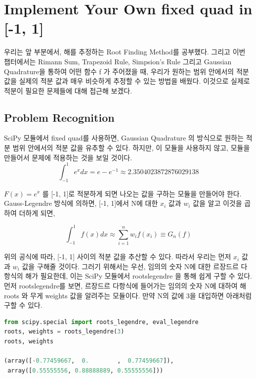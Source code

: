 \documentclass[11pt]{article}
\title{}
\author{MinWook Kang}
\date{\today}
\begin{document}
\maketitle
\pagebreak





\section{Implement Your Own fixed quad in [-1, 1]}

우리는 앞 부분에서, 해를 추정하는 Root Finding Method를 공부했다. 그리고 이번 챕터에서는 Rimann Sum, Trapezoid Rule, Simpsion's Rule 그리고 Gaussian Quadrature을 통하여 어떤 함수 f 가 주어졌을 때, 우리가 원하는 범위 안에서의 적분 값을 실제의 적분 값과 매우 비슷하게 추정할 수 있는 방법을 배웠다. 이것으로 실제로 적분이 필요한 문제들에 대해 접근해 보겠다.
\subsection{Problem Recognition} 
SciPy 모듈에서 fixed quad를 사용하면, Gaussian Quadrature 의 방식으로 원하는 적분 범위 안에서의 적분 값을 유추할 수 있다. 하지만, 이 모듈을 사용하지 않고, 모듈을 만들어서 문제에 적용하는 것을 보일 것이다. 
\begin{equation}
\int_{-1}^{1} e^x dx = e - e^{-1} \approx 2.3504023872876029138
\end{equation}

$F(x) = e^x$ 를 [-1, 1]로 적분하게 되면 나오는 값을 구하는 모듈을 만들어야 한다. Gauss-Legendre 방식에 의하면, [-1, 1]에서 N에 대한 $x_i$ 값과 $w_i$ 값을 알고 이것을 곱하여 더하게 되면, 

\begin{equation}
\int_{-1}^1 f(x) dx \approx \sum_{i = 1}^n w_i f(x_i) \equiv G_n(f)
\end{equation}

위의 공식에 따라, [-1, 1] 사이의 적분 값을 추산할 수 있다. 따라서 우리는 먼저 $x_i$ 값과 $w_i$ 값을 구해줄 것이다. 그러기 위해서는 우선, 임의의 숫자 N에 대한 르장드르 다항식의 해가 필요한데, 이는  SciPy 모듈에서 roots\textunderscore legendre 을 통해 쉽게 구할 수 있다. 
먼저 roots\textunderscore legendre를 보면, 르장드르 다항식에 들어가는 임의의 숫자 N에 대하여 해 roots 와 무게 weights 값을 알려주는 모듈이다. 만약  N의 값에 3을 대입하면 아래처럼 구할 수 있다.

\begin{lstlisting}[language=Python]
from scipy.special import roots_legendre, eval_legendre
roots, weights = roots_legendre(3)
roots, weights

(array([-0.77459667,  0.        ,  0.77459667]),
 array([0.55555556, 0.88888889, 0.55555556]))
\end{lstlisting}
\end{document}
